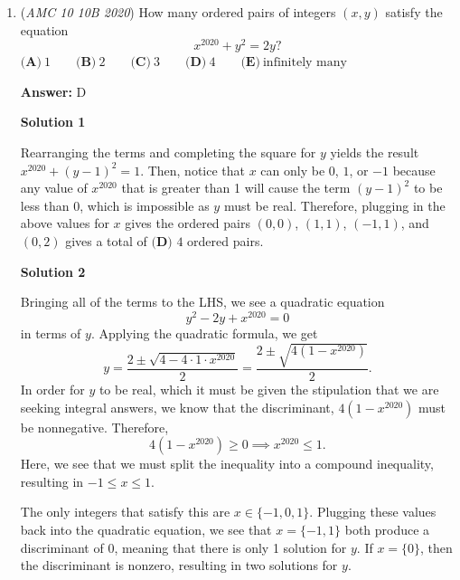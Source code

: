 \begin{enumerate}
\begin{enumerate}
 For $R=(x,-3),$ we have $R=\left(\pm\sqrt7,-3\right)$ by a similar process. 

 \textbf{In this case, there are $\boldsymbol{4}$ such locations for $\boldsymbol{R.}$} 

 

 
            \end{enumerate}
            Together, there are $2+2+4=\boxed{\textbf{(D)}\ 8}$ such locations for $R.$



	\item (\textit{AMC 10 10B 2020}) How many ordered pairs of integers $(x,y)$ satisfy the equation 
 \[x^{2020} + y^2 = 2y?\]
$\textbf{(A)}\ 1 \qquad\textbf{(B)}\ 2 \qquad\textbf{(C)}\  3 \qquad\textbf{(D)}\ 4 \qquad\textbf{(E)}\ \text{infinitely many}$

 \textbf{Answer: }D



\textbf{Solution 1}

Rearranging the terms and completing the square for $y$ yields the result $x^{2020}+(y-1)^2=1$. Then, notice that $x$ can only be $0$, $1$, or $-1$ because any value of $x^{2020}$ that is greater than 1 will cause the term $(y-1)^2$ to be less than $0$, which is impossible as $y$ must be real. Therefore, plugging in the above values for $x$ gives the ordered pairs $(0,0)$, $(1,1)$, $(-1,1)$, and $(0,2)$ gives  a  total  of $\boxed{\textbf{(D) }4}$ ordered pairs.

 



\textbf{Solution 2}

Bringing all of the terms to the LHS, we see a quadratic equation 
 \[y^2 - 2y + x^{2020} = 0\] in terms of $y$. Applying the quadratic formula, we get 
 \[y = \frac{2\pm\sqrt{4-4\cdot1\cdot x^{2020}}}{2}=\frac{2\pm\sqrt{4(1-x^{2020})}}{2}.\] In order for $y$ to be real, which it must be given the stipulation that we are seeking integral answers, we know that the discriminant, $4(1-x^{2020})$ must be nonnegative. Therefore, 
 \[4(1-x^{2020}) \geq 0 \implies x^{2020} \leq 1.\] Here, we see that we must split the inequality into a compound inequality, resulting in $-1 \leq x \leq 1$. 

 The only integers that satisfy this are $x \in \{-1,0,1\}$. Plugging these values back into the quadratic equation, we see that $x = \{-1,1\}$ both produce a discriminant of $0$, meaning that there is only 1 solution for $y$. If $x = \{0\}$, then the discriminant is nonzero, resulting in two solutions for $y$. 


\end{enumerate}
